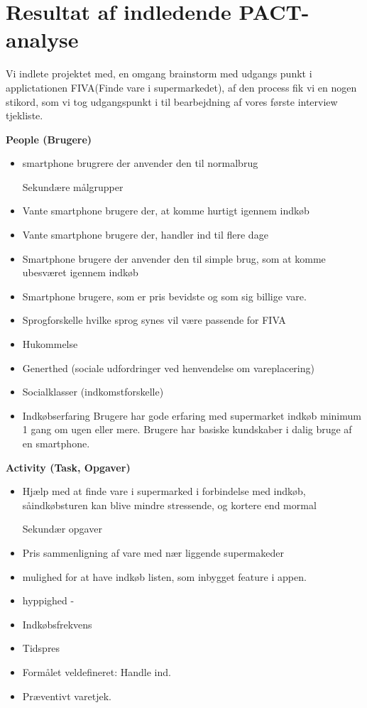 \documentclass[12pt]{article}
\begin{document}
\section*{Resultat af indledende PACT-analyse}
Vi indlete projektet med, en omgang brainstorm med udgangs punkt i applictationen FIVA(Finde vare i supermarkedet), af den process fik vi 
en nogen stikord, som vi tog udgangspunkt i til bearbejdning af vores f\o rste interview tjekliste.
 
\textbf{People (Brugere)}
\begin{itemize}
prim\ae re brugergrupper 
\item smartphone brugrere der anvender den til normalbrug

Sekund\ae re m\aa lgrupper
\item Vante smartphone brugere der, \onsker at komme hurtigt igennem indk\o b
\item Vante smartphone brugere der, handler ind til flere dage
\item Smartphone brugere der anvender den til simple brug, som \onsker at komme ubesv\ae ret igennem indk\o b
\item Smartphone brugere, som er pris bevidste og som \onsker sig billige vare.


\item Sprogforskelle hvilke sprog synes vil v\ae re passende for FIVA
\item Hukommelse 
\item Generthed (sociale udfordringer ved henvendelse om vareplacering)
\item Socialklasser (indkomstforskelle)
\item Indkøbserfaring
Brugere har gode erfaring med supermarket indk\o b minimum 1 gang om ugen eller mere.
Brugere har basiske kundskaber i dalig bruge af en smartphone. 
\end{itemize}

\textbf{Activity (Task, Opgaver)}
\begin{itemize}
prim\ae r opgaver 
\item Hj\ae lp med at finde vare i supermarked i forbindelse med indk\o b, s\aa indk\o bsturen kan blive mindre stressende, 
og kortere end mormal 

Sekund\ae r opgaver 
\item Pris sammenligning af vare med n\ae r liggende supermakeder 
\item mulighed for at have indk\o b listen, som inbygget feature i appen.
\item hyppighed - 
\item Indkøbsfrekvens  
\item Tidspres
\item Formålet veldefineret: Handle ind.
\item Præventivt varetjek. 
\end{itemize}
\end{document}
